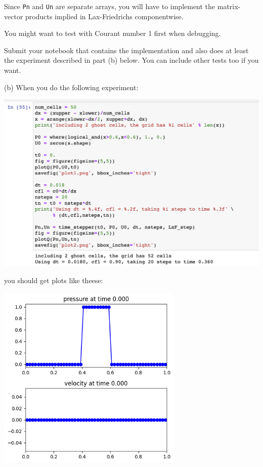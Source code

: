 \documentclass[11pt]{article}
\begin{document}
Since {\tt Pn} and {\tt Un} are separate arrays, you
will have to implement the matrix-vector products implied in Lax-Friedrichs
componentwise.  

You might want to test with Courant number 1 first when debugging.

Submit your notebook that contains the implementation and also does at least
the experiment described in part (b) below. You can include other tests too
if you want.


\vskip 10pt
(b) When you do the following experiment:

\hfil\includegraphics[width=6.0in]{input.png}\hfil

you should get plots like theese:

\hfil\includegraphics[width=3.5in]{plot1.png}\hfil
\end{document}
